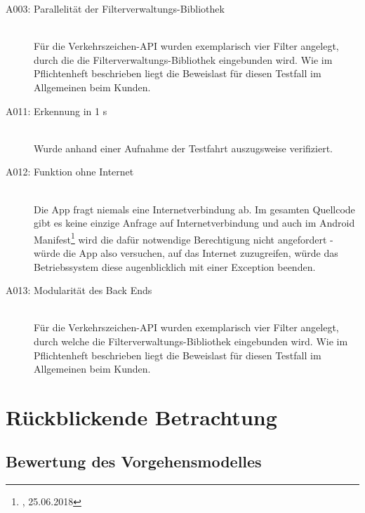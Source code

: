 \documentclass[12pt,a4paper,ngerman,enabledeprecatedfontcommands]{scrreprt}
\begin{document}
\begin{description}

    \item[A003: Parallelität der \gls{Filterverwaltungs-Bibliothek}]~\\ Für die \gls{Verkehrszeichen-API} wurden exemplarisch vier Filter angelegt, durch die die \gls{Filterverwaltungs-Bibliothek} eingebunden wird. Wie im Pflichtenheft beschrieben liegt die Beweislast für diesen Testfall im Allgemeinen beim Kunden.

    \item[A011: Erkennung in 1 s]~\\ Wurde anhand einer Aufnahme der Testfahrt auszugsweise verifiziert.
    
    \item[A012: Funktion ohne Internet]~\\ Die \gls{App} fragt niemals eine Internetverbindung ab. Im gesamten Quellcode gibt es keine einzige Anfrage auf Internetverbindung und auch im Android Manifest\footnote{, 25.06.2018} wird die dafür notwendige Berechtigung nicht angefordert - würde die \gls{App} also versuchen, auf das Internet zuzugreifen, würde das Betriebssystem diese augenblicklich mit einer Exception beenden.
    
    \item[A013: Modularität des Back Ends]~\\ Für die \gls{Verkehrszeichen-API} wurden exemplarisch vier Filter angelegt, durch welche die \gls{Filterverwaltungs-Bibliothek} eingebunden wird. Wie im Pflichtenheft beschrieben liegt die Beweislast für diesen Testfall im Allgemeinen beim Kunden.
    
\end{description}


\part{Rückblickende Betrachtung}

\chapter{Bewertung des Vorgehensmodelles}
\end{document}
